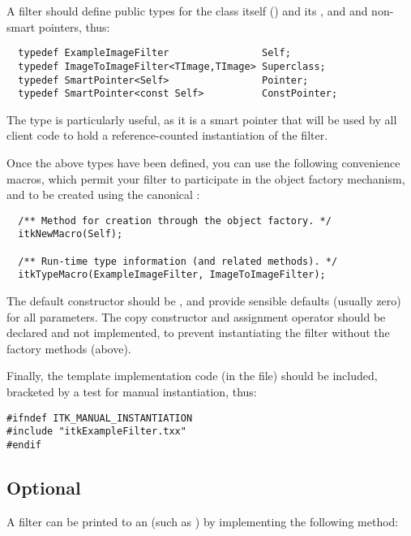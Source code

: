 A filter should define public types for the class itself () and
its , and  and non- smart pointers,
thus:

\begin{verbatim}
  typedef ExampleImageFilter                Self;
  typedef ImageToImageFilter<TImage,TImage> Superclass;
  typedef SmartPointer<Self>                Pointer;
  typedef SmartPointer<const Self>          ConstPointer;
\end{verbatim}

The  type is particularly useful, as it is a smart pointer
that will be used by all client code to hold a reference-counted
instantiation of the filter. 

Once the above types have been defined, you can use the following
convenience macros, which permit your filter to participate in the object
factory mechanism, and to be created using the canonical :

\begin{verbatim}
  /** Method for creation through the object factory. */
  itkNewMacro(Self);  

  /** Run-time type information (and related methods). */
  itkTypeMacro(ExampleImageFilter, ImageToImageFilter);
\end{verbatim}

The default constructor should be , and provide sensible
defaults (usually zero) for all parameters.  The copy constructor and
assignment operator should be declared  and not implemented,
to prevent instantiating the filter without the factory methods (above). 

Finally, the template implementation code (in the  file) should
be included, bracketed by a test for manual instantiation, thus:

\begin{verbatim}
#ifndef ITK_MANUAL_INSTANTIATION
#include "itkExampleFilter.txx"
#endif
\end{verbatim}

\subsection{Optional}
\label{sec:FilterPrinting}

A filter can be printed to an  (such as )
by implementing the following method:

